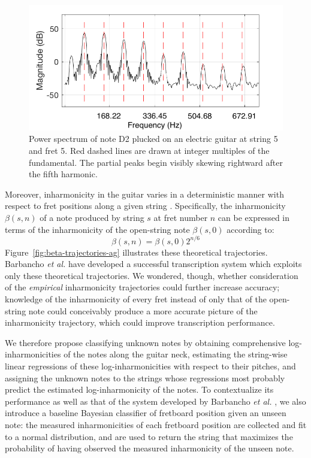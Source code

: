 \documentclass[convention,peer-reviewed]{aesconf}
\begin{document}
\begin{figure}[!htbp]
\centering
\includegraphics[scale=0.3]{skew-freq}
\caption{Power spectrum of note D2 plucked on an electric guitar at string 5 and fret 5. Red dashed lines are drawn at integer multiples of the fundamental. The partial peaks begin visibly skewing rightward after the fifth harmonic.}
\label{fig:skew-freq}
\end{figure}

Moreover, inharmonicity in the guitar varies in a deterministic manner with respect to fret positions along a given string \citep{barbanchoi2012}. Specifically, the inharmonicity $\beta(s,n)$ of a note produced by string $s$ at fret number $n$ can be expressed in terms of the inharmonicity of the open-string note $\beta(s,0)$ according to:
\begin{equation} 
\label{eq:beta-traj}
\beta(s,n) = \beta(s,0)2^{n/6}
\end{equation}
Figure~\ref{fig:beta-trajectories-ag} illustrates these theoretical trajectories. Barbancho \emph{et al.} \citep{barbanchoi2012} have developed a successful transcription system which exploits only these theoretical trajectories. We wondered, though, whether consideration of the \textit{empirical} inharmonicity trajectories could further increase accuracy; knowledge of the inharmonicity of every fret instead of only that of the open-string note could conceivably produce a more accurate picture of the inharmonicity trajectory, which could improve transcription performance.

We therefore propose classifying unknown notes by obtaining comprehensive log-inharmonicities of the notes along the guitar neck, estimating the string-wise linear regressions of these log-inharmonicities with respect to their pitches, and assigning the unknown notes to the strings whose regressions most probably predict the estimated log-inharmonicity of the notes. To contextualize its performance as well as that of the system developed by Barbancho \emph{et al.} \citep{barbanchoi2012}, we also introduce a baseline Bayesian classifier of fretboard position given an unseen note: the measured inharmonicities of each fretboard position are collected and fit to a normal distribution, and are used to return the string that maximizes the probability of having observed the measured inharmonicity of the unseen note.
\end{document}
